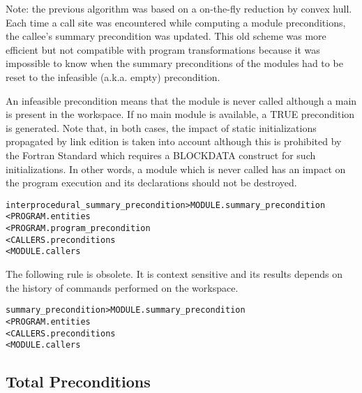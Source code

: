 \documentclass[a4paper]{report}
\newenvironment{PipsMake}{\begin{alltt}}{\end{alltt}}
\begin{document}
Note: the previous algorithm was based on a on-the-fly reduction by
convex hull. Each time a call site was encountered while computing a
module preconditions, the callee's summary precondition was updated. This
old scheme was more efficient but not compatible with program
transformations because it was impossible to know when the summary
preconditions of the modules had to be reset to the infeasible
(a.k.a. empty) precondition.

An infeasible precondition means that the module is never called although
a main is present in the workspace. If no main module is available, a TRUE
precondition is generated. Note that, in both cases, the impact of static
initializations propagated by link edition is taken into account although
this is prohibited by the Fortran Standard which requires a BLOCKDATA
construct for such initializations. In other words, a module which is
never called has an impact on the program execution and its declarations
should not be destroyed.

\begin{PipsMake}
interprocedural_summary_precondition            > MODULE.summary_precondition
        < PROGRAM.entities
        < PROGRAM.program_precondition
        < CALLERS.preconditions
        < MODULE.callers
\end{PipsMake}

The following rule is obsolete. It is context sensitive and its results
depends on the history of commands performed on the workspace.

\begin{PipsMake}
summary_precondition            > MODULE.summary_precondition
        < PROGRAM.entities
        < CALLERS.preconditions
        < MODULE.callers
\end{PipsMake}

\subsection{Total Preconditions}
\label{subsubsection-ototal-preconditions}
\end{document}
